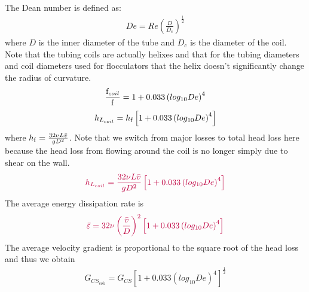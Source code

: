 \documentclass[letterpaper,10pt,english]{sphinxmanual}
\begin{document}
The Dean number is defined as:
\begin{equation}\label{equation:Rapid_Mix/RM_Derivations:Rapid_Mix/RM_Derivations:61}
\begin{split}De = Re\left(\frac{D}{D_c}\right)^\frac{1}{2}\end{split}
\end{equation}
where \(D\) is the inner diameter of the tube and \(D_c\) is the diameter of the coil. Note that the tubing coils are actually helixes and that for the tubing diameters and coil diameters used for flocculators that the helix doesn’t significantly change the radius of curvature.
\begin{equation}\label{equation:Rapid_Mix/RM_Derivations:Rapid_Mix/RM_Derivations:62}
\begin{split}\frac{{\rm f}_{coil}}{{\rm f}} = 1 + 0.033\left(log_{10}De\right)^4\end{split}
\end{equation}\begin{equation}\label{equation:Rapid_Mix/RM_Derivations:Rapid_Mix/RM_Derivations:63}
\begin{split}h_{L_{coil}} = h_{{\rm f}} \left[ 1 + 0.033\left(log_{10}De\right)^4 \right]\end{split}
\end{equation}
where \(h_{{\rm f}} = \frac{32\nu L\bar v}{ g D^2}\). Note that we switch from major losses to total head loss here because the head loss from flowing around the coil is no longer simply due to shear on the
wall.
\begin{equation}\label{equation:Rapid_Mix/RM_Derivations:Rapid_Mix/RM_Derivations:64}
\begin{split}\color{purple}{
h_{L_{coil}} = \frac{32\nu L\bar v}{ g D^2} \left[ 1 + 0.033\left(log_{10}De\right)^4 \right]
}\end{split}
\end{equation}
The average energy dissipation rate is
\begin{equation}\label{equation:Rapid_Mix/RM_Derivations:Rapid_Mix/RM_Derivations:65}
\begin{split}\color{purple}{
\bar\varepsilon = 32\nu \left( \frac{\bar v}{D} \right)^2 \left[ 1 + 0.033\left(log_{10}De\right)^4 \right]
}\end{split}
\end{equation}
The average velocity gradient is proportional to the square root of the head loss and thus we obtain
\begin{equation}\label{equation:Rapid_Mix/RM_Derivations:Rapid_Mix/RM_Derivations:66}
\begin{split}G_{CS_{coil}} = G_{CS}\left[ 1 + 0.033\left(log_{10}De\right)^4  \right]^\frac{1}{2}\end{split}
\end{equation}
\end{document}

